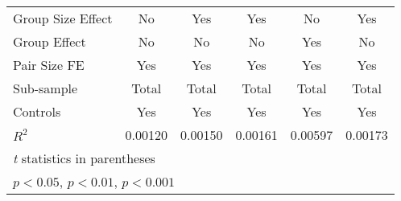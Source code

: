 {\begin{tabular}{l*{5}{c}}
Group Size Effect&       No         &      Yes         &      Yes         &       No         &      Yes         \\
Group Effect    &       No         &       No         &       No         &      Yes         &       No         \\
Pair Size FE    &      Yes         &      Yes         &      Yes         &      Yes         &      Yes         \\
Sub-sample      &    Total         &    Total         &    Total         &    Total         &    Total         \\
Controls        &      Yes         &      Yes         &      Yes         &      Yes         &      Yes         \\
$ R^2 $         &  0.00120         &  0.00150         &  0.00161         &  0.00597         &  0.00173         \\
\hline\hline
\multicolumn{6}{l}{\footnotesize \textit{t} statistics in parentheses}\\
\multicolumn{6}{l}{\footnotesize \sym{*} \(p<0.05\), \sym{**} \(p<0.01\), \sym{***} \(p<0.001\)}\\
\end{tabular}
}
